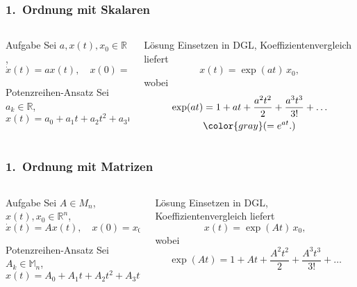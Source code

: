 \begin{frame}[t]
  \setlength{\abovedisplayskip}{5pt}
  \setlength{\belowdisplayskip}{5pt}
  \frametitle{1.~Ordnung mit Skalaren}
  \vspace{-20pt}
  \begin{columns}[t,onlytextwidth]
  \begin{column}{0.48\textwidth}
    \begin{block}{Aufgabe}
      Sei $a, x(t), x_0 \in \mathbb R$,
      \[
      \dot x(t) = ax(t),
      \quad
      x(0) = x_0
      \]
    \end{block}
    \begin{block}{Potenzreihen-Ansatz}
      Sei $a_k \in \mathbb R$,
      \[
      x(t) = a_0 + a_1t + a_2t^2 + a_3t^3 \ldots
      \]
    \end{block}
  \end{column}
  \begin{column}{0.48\textwidth}
    \begin{block}{Lösung}
      Einsetzen in DGL, Koeffizientenvergleich liefert
      \[ x(t) = \exp(at) \, x_0, \]
      wobei
      \begin{align*}
      \exp(at)
      &= 1 + at + \frac{a^2t^2}{2} + \frac{a^3t^3}{3!} + \ldots \\
      &{\color{gray}(= e^{at}.)}
      \end{align*}
    \end{block}
  \end{column}
  \end{columns}
\end{frame}

\begin{frame}[t]
  \setlength{\abovedisplayskip}{5pt}
  \setlength{\belowdisplayskip}{5pt}
  \frametitle{1.~Ordnung mit Matrizen}
  \vspace{-20pt}
  \begin{columns}[t,onlytextwidth]
    \begin{column}{0.48\textwidth}
      \begin{block}{Aufgabe}
        Sei $A \in M_n$, $x(t), x_0 \in \mathbb R^n$,
        \[
        \dot x(t) = Ax(t),
        \quad
        x(0) = x_0
        \]
      \end{block}
      \begin{block}{Potenzreihen-Ansatz}
        Sei $A_k \in \mathbb M_n$,
        \[
        x(t) = A_0 + A_1t + A_2t^2 + A_3t^3 \ldots
        \]
      \end{block}
    \end{column}
    \begin{column}{0.48\textwidth}
      \begin{block}{Lösung}
        Einsetzen in DGL, Koeffizientenvergleich liefert
        \[ x(t) = \exp(At) \, x_0, \]
        wobei
        \[
        \exp(At)
        = 1 + At + \frac{A^2t^2}{2} + \frac{A^3t^3}{3!} + \ldots
        \]
      \end{block}
    \end{column}
  \end{columns}
\end{frame}

\egroup
